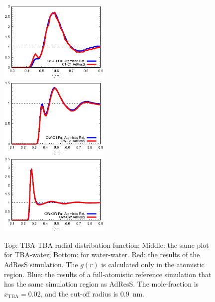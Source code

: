 \documentclass[a4paper,preprint,unsortedaddress]{revtex4-1}
\newcommand{\concenttba}{x_{\textrm{TBA}}}
\begin{document}
\begin{figure}
\center
\includegraphics[width=0.475\textwidth]{alcohol-alcohol.eps}\\
\includegraphics[width=0.475\textwidth]{alcohol-water.eps}\\
\includegraphics[width=0.475\textwidth]{water-water.eps}
\caption{Top: TBA-TBA radial distribution function; Middle: the same plot for TBA-water; Bottom: for water-water.
  Red: the results of the AdResS simulation.
  The $g(r)$ is calculated only in the atomistic region.
  Blue: the results of a full-atomistic reference simulation that has the same simulation region as AdResS.
  The mole-fraction is $\concenttba=0.02$, and the cut-off radius is 0.9~nm.}
\label{gr}
\end{figure}
\end{document}
